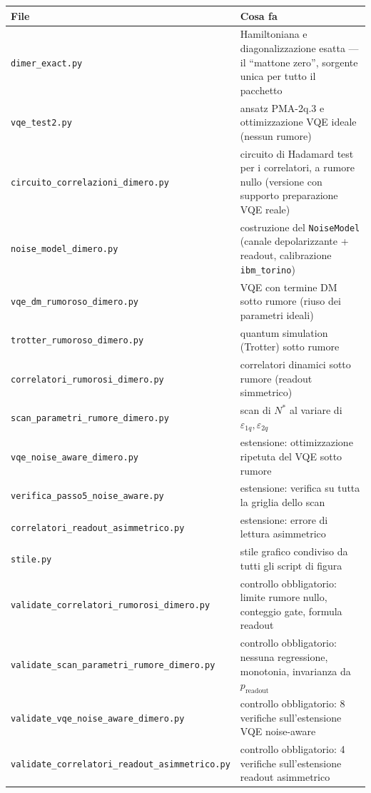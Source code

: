 \documentclass[11pt,a4paper]{article}
\newcommand{\code}[1]{\texttt{\small #1}}
\begin{document}
{\footnotesize
\begin{longtable}{@{}p{4.9cm}p{9.3cm}@{}}
\toprule
\textbf{File} & \textbf{Cosa fa} \\
\midrule
\endhead
\raggedright\code{dimer\_exact.py} & Hamiltoniana e diagonalizzazione esatta --- il ``mattone zero'', sorgente unica per tutto il pacchetto \\
\raggedright\code{vqe\_test2.py} & ansatz PMA-2q.3 e ottimizzazione VQE ideale (nessun rumore) \\
\raggedright\code{circuito\_correlazioni\_\allowbreak dimero.py} & circuito di Hadamard test per i correlatori, a rumore nullo (versione con supporto preparazione VQE reale) \\
\raggedright\code{noise\_model\_dimero.py} & costruzione del \code{NoiseModel} (canale depolarizzante + readout, calibrazione \code{ibm\_torino}) \\
\raggedright\code{vqe\_dm\_rumoroso\_\allowbreak dimero.py} & VQE con termine DM sotto rumore (riuso dei parametri ideali) \\
\raggedright\code{trotter\_rumoroso\_\allowbreak dimero.py} & quantum simulation (Trotter) sotto rumore \\
\raggedright\code{correlatori\_rumorosi\_\allowbreak dimero.py} & correlatori dinamici sotto rumore (readout simmetrico) \\
\raggedright\code{scan\_parametri\_rumore\_\allowbreak dimero.py} & scan di $N^*$ al variare di $\varepsilon_{1q},\varepsilon_{2q}$ \\
\raggedright\code{vqe\_noise\_aware\_\allowbreak dimero.py} & estensione: ottimizzazione ripetuta del VQE sotto rumore \\
\raggedright\code{verifica\_passo5\_\allowbreak noise\_aware.py} & estensione: verifica su tutta la griglia dello scan \\
\raggedright\code{correlatori\_readout\_\allowbreak asimmetrico.py} & estensione: errore di lettura asimmetrico \\
\raggedright\code{stile.py} & stile grafico condiviso da tutti gli script di figura \\
\raggedright\code{validate\_correlatori\_\allowbreak rumorosi\_dimero.py} & controllo obbligatorio: limite rumore nullo, conteggio gate, formula readout \\
\raggedright\code{validate\_scan\_parametri\_\allowbreak rumore\_dimero.py} & controllo obbligatorio: nessuna regressione, monotonia, invarianza da $p_\text{readout}$ \\
\raggedright\code{validate\_vqe\_noise\_\allowbreak aware\_dimero.py} & controllo obbligatorio: 8 verifiche sull'estensione VQE noise-aware \\
\raggedright\code{validate\_correlatori\_\allowbreak readout\_asimmetrico.py} & controllo obbligatorio: 4 verifiche sull'estensione readout asimmetrico \\
\bottomrule
\end{longtable}
}
\end{document}
